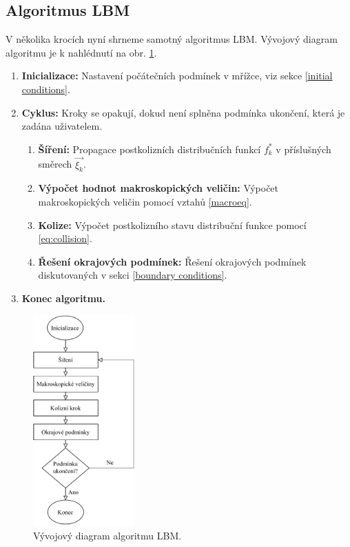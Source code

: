 \subsection{Algoritmus LBM}\label{algo}
V několika krocích nyní shrneme samotný algoritmus LBM. Vývojový diagram algoritmu je k nahlédnutí na obr. \ref{fig:algo}.
\begin{enumerate}
	\item \textbf{Inicializace:} Nastavení počátečních podmínek v mřížce, viz sekce \ref{initial conditions}.
	\item \textbf{Cyklus:} Kroky se opakují, dokud není splněna podmínka ukončení, která je zadána uživatelem.
	\begin{enumerate}
		\item \textbf{Šíření:} Propagace postkolizních distribučních funkcí $ f^{*}_{k} $  v příslušných směrech $ \vec{\xi_{k}} $.
		\item \textbf{Výpočet hodnot makroskopických veličin:} Výpočet makroskopických veličin pomocí vztahů \eqref{macroeq}.
		\item \textbf{Kolize:} Výpočet postkolizního stavu distribuční funkce pomocí \eqref{eq:collision}.
		\item \textbf{Řešení okrajových podmínek:} Řešení okrajových podmínek diskutovaných v sekci \ref{boundary conditions}.
	\end{enumerate}
	\item \textbf{Konec algoritmu.}
\end{enumerate}
\begin{figure}[H]
	\centering
	\vspace{-8mm}
	\includegraphics[width=0.35\textwidth]{Images/algo.pdf}
	\caption{Vývojový diagram algoritmu LBM.}
	\label{fig:algo}
\end{figure}

